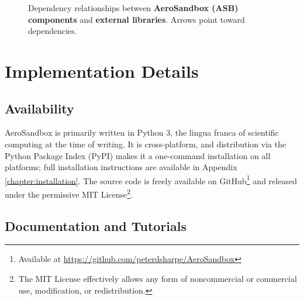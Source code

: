 
\begin{figure}[h]
    \centerline{}
    \caption{Dependency relationships between \textbf{\textcolor{c1!80!black}{AeroSandbox (ASB) components}} and \textbf{\textcolor{c2!80!black}{external libraries}}. Arrows point toward dependencies.}
    \label{fig:asb-diagram}
\end{figure}


\section{Implementation Details}

\subsection{Availability}

AeroSandbox is primarily written in Python 3, the lingua franca of scientific computing at the time of writing. It is cross-platform, and distribution via the Python Package Index (PyPI) makes it a one-command installation on all platforms; full installation instructions are available in Appendix \ref{chapter:installation}. The source code is freely available on GitHub\footnote{Available at \url{https://github.com/peterdsharpe/AeroSandbox}} and released under the permissive MIT License\footnote{The MIT License effectively allows any form of noncommercial or commercial use, modification, or redistribution.}.

\subsection{Documentation and Tutorials}


